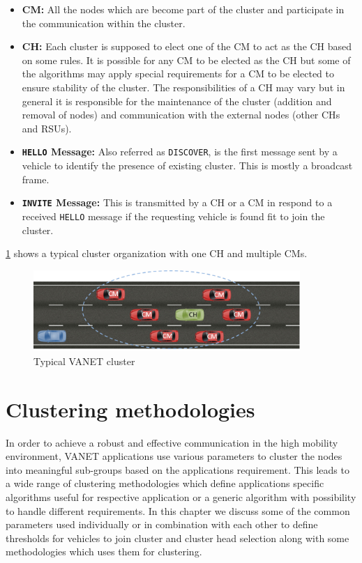 \documentclass[]{ccs-thesis}
\begin{document}
\begin{itemize}
    \item \textbf{\ac{CM}:} All the nodes which are become part of the cluster and participate in the
          communication within the cluster.
    \item \textbf{\ac{CH}:} Each cluster is supposed to elect one of the \ac{CM} to act as the \ac{CH}
          based on some rules. It is possible for any \ac{CM} to be elected as the \ac{CH} but some of the algorithms
          may apply special requirements for a \ac{CM} to be elected to ensure stability of the cluster. The responsibilities
          of a \ac{CH} may vary but in general it is responsible for the maintenance of the cluster
          (addition and removal of nodes) and communication with the external nodes (other \ac{CH}s and \ac{RSU}s).
    \item \textbf{\texttt{HELLO} Message:} Also referred as \texttt{DISCOVER}, is the first message sent by a vehicle to identify
          the presence of existing cluster. This is mostly a broadcast frame.
    \item \textbf{\texttt{INVITE} Message:} This is transmitted by a \ac{CH} or a \ac{CM} in respond to a received \texttt{HELLO} message
          if the requesting vehicle is found fit to join the cluster.
\end{itemize}

\cref{fig:cluster} shows a typical cluster organization with one \ac{CH} and multiple \ac{CM}s.

\begin{figure}[h]%
    \centering
    \includegraphics[width=0.9\textwidth]{figures/cluster}
    \caption{Typical \ac{VANET} cluster }
    \label{fig:cluster}
\end{figure}

\chapter{Clustering methodologies}
\label{sec:methodologies}

In order to achieve a robust and effective communication in the high mobility environment, \ac{VANET} applications use various
parameters to cluster the nodes into meaningful sub-groups based on the applications requirement. This leads to a wide
range of clustering methodologies which define applications specific algorithms useful for respective application or
a generic algorithm with possibility to handle different requirements. In this chapter we discuss some of the common
parameters used individually or in combination with each other to define thresholds for vehicles to join cluster and
cluster head selection along with some methodologies which uses them for clustering.
\end{document}
